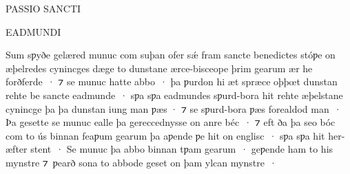 \documentclass[10pt]{book}
\begin{document}
\cleardoublepage


\begin{center}
{\bfseries \lsstyle

\phantom{ }\vfill

{\color{BrickRed} \Large }

\vspace{0.2cm}

{\Huge PASSIO SANCTI}

\vspace{0.2cm}

{\Huge EADMUNDI}

\vfill

}

\end{center}


\clearpage




\begin{center}
\footnotesize{}
\end{center}

Sum sƿyðe gel\ae{}red munuc com suþan ofer s\'\ae{} fram sancte benedictes st\'oƿe on \ae{}þelredes cynincges d\ae{}ge to dunstane \ae{}rce-bisceope þrim gearum \ae{}r he forðferde~· ⁊ se munuc hatte abbo~· þa ƿurdon hi \ae{}t spr\ae{}ce oþþ\oe{}t dunstan rehte be sancte eadmunde~· sƿa sƿa eadmundes sƿurd-bora hit rehte \ae{}þelstane cynincge þa þa dunstan iung man ƿ\ae{}s · ⁊ se sƿurd-bora ƿ\ae{}s forealdod man~· Þa gesette  se munuc ealle þa gereccednysse on anre b\'ec~· ⁊ eft ða þa seo b\'oc com to \'us binnan feaƿum gearum þa aƿende ƿe hit on englisc~· sƿa sƿa hit her-\ae{}fter stent~· Se munuc þa abbo binnan tƿam gearum~· geƿende ham to his mynstre ⁊~ƿearð sona to abbode geset on þam ylcan mynstre~·\linebreak{}

\vspace{0.2cm}
\end{document}

